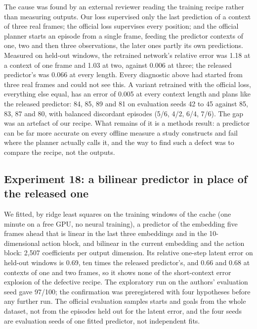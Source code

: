 \documentclass[11pt,a4paper]{article}
\begin{document}
The cause was found by an external reviewer reading the training recipe rather than measuring outputs. Our loss supervised only the last prediction of a context of three real frames; the official loss supervises every position; and the official planner starts an episode from a single frame, feeding the predictor contexts of one, two and then three observations, the later ones partly its own predictions. Measured on held-out windows, the retrained network's relative error was 1.18 at a context of one frame and 1.03 at two, against 0.006 at three; the released predictor's was 0.066 at every length. Every diagnostic above had started from three real frames and could not see this. A variant retrained with the official loss, everything else equal, has an error of 0.005 at every context length and plans like the released predictor: 84, 85, 89 and 81 on evaluation seeds 42 to 45 against 85, 83, 87 and 80, with balanced discordant episodes (5/6, 4/2, 6/4, 7/6). The gap was an artefact of our recipe. What remains of it is a methods result: a predictor can be far more accurate on every offline measure a study constructs and fail where the planner actually calls it, and the way to find such a defect was to compare the recipe, not the outputs.

\subsection{Experiment 18: a bilinear predictor in place of the released one}
\label{sec:operator}

We fitted, by ridge least squares on the training windows of the cache (one minute on a free GPU, no neural training), a predictor of the embedding five frames ahead that is linear in the last three embeddings and in the 10-dimensional action block, and bilinear in the current embedding and the action block: 2,507 coefficients per output dimension. Its relative one-step latent error on held-out windows is 0.69, ten times the released predictor's, and 0.66 and 0.68 at contexts of one and two frames, so it shows none of the short-context error explosion of the defective recipe. The exploratory run on the authors' evaluation seed gave 97/100; the confirmation was preregistered with four hypotheses before any further run. The official evaluation samples starts and goals from the whole dataset, not from the episodes held out for the latent error, and the four seeds are evaluation seeds of one fitted predictor, not independent fits.
\end{document}
